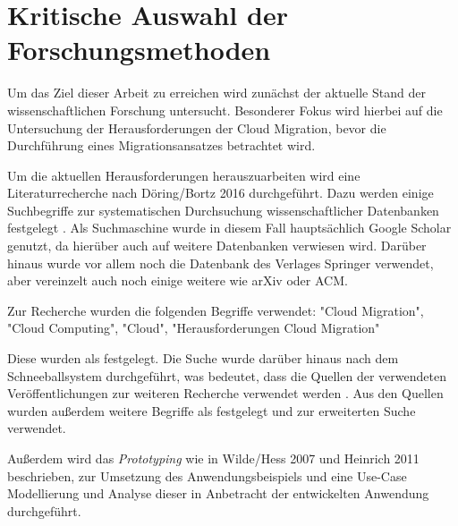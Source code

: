 \section{Kritische Auswahl der Forschungsmethoden}
\label{sec:auswahl_forschungsmethoden}


Um das Ziel dieser Arbeit zu erreichen wird zunächst der aktuelle Stand der wissenschaftlichen Forschung untersucht. Besonderer Fokus wird hierbei auf die Untersuchung der Herausforderungen der Cloud Migration, bevor die Durchführung eines Migrationsansatzes betrachtet wird.

Um die aktuellen Herausforderungen herauszuarbeiten wird eine Literaturrecherche nach Döring/Bortz 2016 durchgeführt. Dazu werden einige Suchbegriffe zur systematischen Durchsuchung wissenschaftlicher Datenbanken festgelegt \cite[Vgl.][S. 158]{Doering2016}. Als Suchmaschine wurde in diesem Fall hauptsächlich Google Scholar genutzt, da hierüber auch auf weitere Datenbanken verwiesen wird. Darüber hinaus wurde vor allem noch die Datenbank des Verlages Springer verwendet, aber vereinzelt auch noch einige weitere wie arXiv oder ACM.

Zur Recherche wurden die folgenden Begriffe verwendet: "Cloud Migration", "Cloud Computing", "Cloud", "Herausforderungen Cloud Migration"

Diese wurden als \textbf{\grqq{}} \cite[S. 158]{Doering2016} festgelegt. Die Suche wurde darüber hinaus nach dem Schneeballsystem durchgeführt, was bedeutet, dass die Quellen der verwendeten Veröffentlichungen zur weiteren Recherche verwendet werden \cite[Vgl.][S. 160]{Doering2016}. Aus den Quellen wurden außerdem weitere Begriffe als \textbf{\grqq{}} \cite[S. 158]{Doering2016} festgelegt und zur erweiterten Suche verwendet.

Außerdem wird das \textit{Prototyping} wie in Wilde/Hess 2007 und Heinrich 2011 beschrieben, zur Umsetzung des Anwendungsbeispiels und eine Use-Case Modellierung und Analyse dieser in Anbetracht der entwickelten Anwendung durchgeführt.